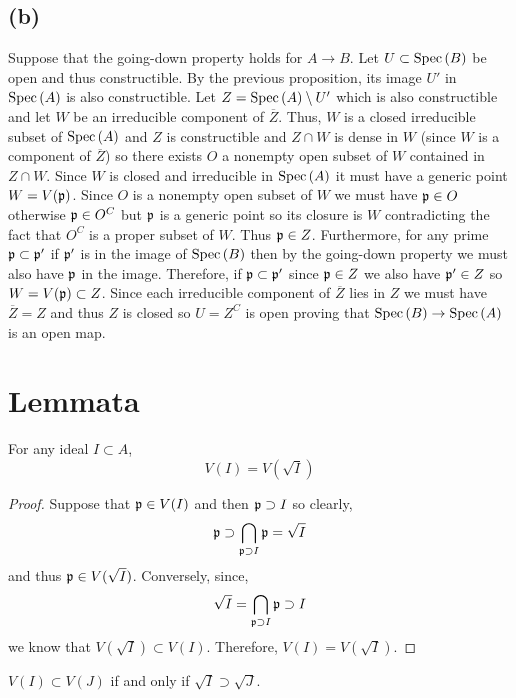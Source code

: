 \documentclass[12pt]{extarticle}
\begin{document}
\subsection*{(b)}

Suppose that the going-down property holds for $A \to B$. Let $U \subset \mathrm{Spec}\left( B \right)$ be open and thus constructible. By the previous proposition, its image $U'$ in $\mathrm{Spec}\left( A \right)$ is also constructible. Let $Z = \mathrm{Spec}\left( A \right) \setminus U'$ which is also constructible and let $W$ be an irreducible component of $\overline{Z}$. Thus, $W$ is a closed irreducible subset of $\mathrm{Spec}\left( A \right)$ and $Z$ is constructible and $Z \cap W$ is dense in $W$ (since $W$ is a component of $\overline{Z}$) so there exists $O$ a nonempty open subset of $W$ contained in $Z \cap W$. Since $W$ is closed and irreducible in $\mathrm{Spec}\left( A \right)$ it must have a generic point $W = V(\mathfrak{p})$. Since $O$ is a nonempty open subset of $W$ we must have $\mathfrak{p} \in O$ otherwise $\mathfrak{p} \in O^C$ but $\mathfrak{p}$ is a generic point so its closure is $W$ contradicting the fact that $O^C$ is a proper subset of $W$. Thus $\mathfrak{p} \in Z$. Furthermore, for any prime $\mathfrak{p} \subset \mathfrak{p}'$ if $\mathfrak{p}'$ is in the image of $\mathrm{Spec}\left( B \right)$ then by the going-down property we must also have $\mathfrak{p}$ in the image. Therefore, if $\mathfrak{p} \subset \mathfrak{p}'$ since $\mathfrak{p} \in Z$ we also have $\mathfrak{p}' \in Z$ so $W = V(\mathfrak{p}) \subset Z$. Since each irreducible component of $\overline{Z}$ lies in $Z$ we must have $\overline{Z} = Z$ and thus $Z$ is closed so $U = Z^C$ is open proving that $\mathrm{Spec}\left( B \right) \to \mathrm{Spec}\left( A \right)$ is an open map. 

\section{Lemmata}


\begin{lemma} \label{radical_generates_same_set}
For any ideal $I \subset A$,
\[ V(I) = V(\sqrt{I}) \]
\end{lemma}

\begin{proof} 
Suppose that $\mathfrak{p} \in V(I)$ and then $\mathfrak{p} \supset I$ so clearly,
\[ \mathfrak{p} \supset \bigcap_{\mathfrak{p} \supset I} \mathfrak{p} = \sqrt{I} \]
and thus $\mathfrak{p} \in V(\sqrt{I})$. Conversely, since,
\[ \sqrt{I} = \bigcap_{\mathfrak{p} \supset I} \mathfrak{p} \supset I \]
we know that $V(\sqrt{I}) \subset V(I)$. Therefore, $V(I) = V(\sqrt{I})$. 
\end{proof}

\begin{lemma} \label{radical_order}
$V(I) \subset V(J)$ if and only if $\sqrt{I} \supset \sqrt{J}$.
\end{lemma}
\end{document}

